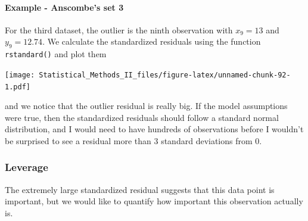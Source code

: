 \documentclass[]{book}
\newenvironment{Shaded}{\begin{snugshade}}{\end{snugshade}}
\newcommand{\KeywordTok}[1]{\textcolor[rgb]{0.13,0.29,0.53}{\textbf{{#1}}}}
\newcommand{\DataTypeTok}[1]{\textcolor[rgb]{0.13,0.29,0.53}{{#1}}}
\newcommand{\StringTok}[1]{\textcolor[rgb]{0.31,0.60,0.02}{{#1}}}
\newcommand{\CommentTok}[1]{\textcolor[rgb]{0.56,0.35,0.01}{\textit{{#1}}}}
\newcommand{\NormalTok}[1]{{#1}}
\let\oldparagraph\paragraph
\renewcommand{\paragraph}[1]{\oldparagraph{#1}\mbox{}}
\theoremstyle{definition}
\theoremstyle{definition}
\theoremstyle{remark}
\begin{document}
\paragraph{Example - Anscombe's set 3}\label{example---anscombes-set-3}

For the third dataset, the outlier is the ninth observation with
\(x_{9}=13\) and \(y_{9}=12.74\). We calculate the standardized
residuals using the function \texttt{rstandard()} and plot them

\begin{Shaded}
\end{Shaded}

\texttt{[image: Statistical\_Methods\_II\_files/figure-latex/unnamed-chunk-92-1.pdf]}

and we notice that the outlier residual is really big. If the model
assumptions were true, then the standardized residuals should follow a
standard normal distribution, and I would need to have hundreds of
observations before I wouldn't be surprised to see a residual more than
3 standard deviations from 0.

\subsubsection{Leverage}\label{leverage}

The extremely large standardized residual suggests that this data point
is important, but we would like to quantify how important this
observation actually is.
\end{document}
